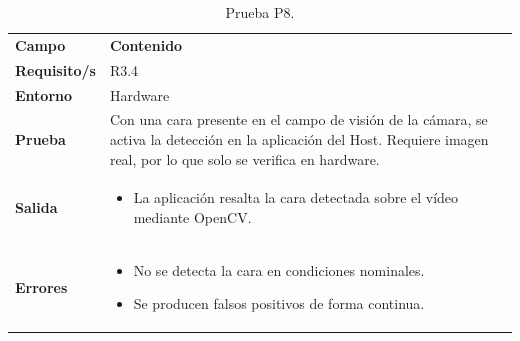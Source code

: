 \documentclass[../main.tex]{subfiles}
\begin{document}
\begin{table}[H]
\centering
\caption{Prueba P8.}
\label{tab:prueba_p8}
\begin{tabular}{>{\raggedright\arraybackslash}p{2.5cm}>{\raggedright\arraybackslash}p{11cm}}
\rowcolor[HTML]{156082}
{\color{white}\textbf{Campo}} & {\color{white}\textbf{Contenido}} \\
\rowcolor[HTML]{C0E6F5}
\textbf{Requisito/s} & R3.4 \\
\textbf{Entorno} & Hardware \\
\rowcolor[HTML]{C0E6F5}
\textbf{Prueba} & Con una cara presente en el campo de visión de la cámara, se activa la detección en la aplicación del Host. Requiere imagen real, por lo que solo se verifica en hardware. \\
\textbf{Salida} & \begin{itemize}\setlength{\itemsep}{0pt}
    \item La aplicación resalta la cara detectada sobre el vídeo mediante OpenCV.
\end{itemize} \\
\rowcolor[HTML]{C0E6F5}
\textbf{Errores} & \begin{itemize}\setlength{\itemsep}{0pt}
    \item No se detecta la cara en condiciones nominales.
    \item Se producen falsos positivos de forma continua.
\end{itemize} \\
\end{tabular}
\end{table}
\end{document}
